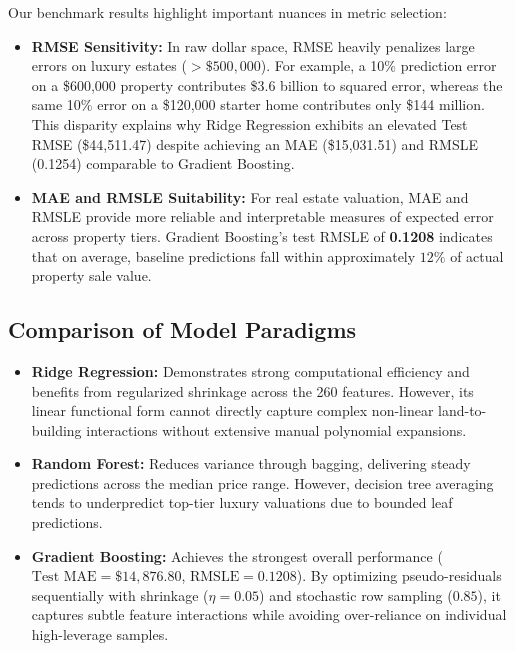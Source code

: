 \documentclass[11pt,a4paper]{article}
\begin{document}
Our benchmark results highlight important nuances in metric selection:
\begin{itemize}
    \item \textbf{RMSE Sensitivity:} In raw dollar space, RMSE heavily penalizes large errors on luxury estates ($>\$500,000$). For example, a 10\% prediction error on a \$600,000 property contributes \$3.6 billion to squared error, whereas the same 10\% error on a \$120,000 starter home contributes only \$144 million. This disparity explains why Ridge Regression exhibits an elevated Test RMSE (\$44,511.47) despite achieving an MAE (\$15,031.51) and RMSLE (0.1254) comparable to Gradient Boosting.
    \item \textbf{MAE and RMSLE Suitability:} For real estate valuation, MAE and RMSLE provide more reliable and interpretable measures of expected error across property tiers. Gradient Boosting's test RMSLE of \textbf{0.1208} indicates that on average, baseline predictions fall within approximately $12\%$ of actual property sale value.
\end{itemize}

\subsection{Comparison of Model Paradigms}
\begin{itemize}
    \item \textbf{Ridge Regression:} Demonstrates strong computational efficiency and benefits from regularized shrinkage across the 260 features. However, its linear functional form cannot directly capture complex non-linear land-to-building interactions without extensive manual polynomial expansions.
    \item \textbf{Random Forest:} Reduces variance through bagging, delivering steady predictions across the median price range. However, decision tree averaging tends to underpredict top-tier luxury valuations due to bounded leaf predictions.
    \item \textbf{Gradient Boosting:} Achieves the strongest overall performance ($\text{Test MAE} = \$14,876.80$, $\text{RMSLE} = 0.1208$). By optimizing pseudo-residuals sequentially with shrinkage ($\eta = 0.05$) and stochastic row sampling ($0.85$), it captures subtle feature interactions while avoiding over-reliance on individual high-leverage samples.
\end{itemize}
\end{document}
